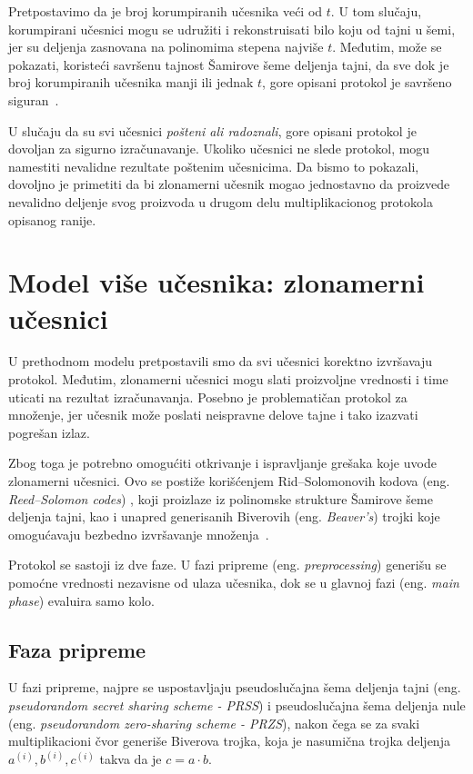 Pretpostavimo da je broj korumpiranih učesnika veći od $t$. U tom slučaju, korumpirani učesnici mogu se udružiti i rekonstruisati bilo koju od tajni u šemi, jer su deljenja zasnovana na polinomima stepena najviše $t$. Međutim, može se pokazati, koristeći savršenu tajnost Šamirove šeme deljenja tajni, da sve dok je broj korumpiranih učesnika manji ili jednak $t$, gore opisani protokol je savršeno siguran~\cite{smart2016cryptography}.

U slučaju da su svi učesnici \emph{pošteni ali radoznali}, gore opisani protokol je dovoljan za sigurno izračunavanje. Ukoliko učesnici ne slede protokol, mogu namestiti nevalidne rezultate poštenim učesnicima. Da bismo to pokazali, dovoljno je primetiti da bi zlonamerni učesnik mogao jednostavno da proizvede nevalidno deljenje svog proizvoda u drugom delu multiplikacionog protokola opisanog ranije\cite{smart2016cryptography}. 


\section{Model više učesnika: zlonamerni učesnici}

U prethodnom modelu pretpostavili smo da svi učesnici korektno izvršavaju protokol. Međutim, zlonamerni učesnici mogu slati proizvoljne vrednosti i time uticati na rezultat izračunavanja. Posebno je problematičan protokol za množenje, jer učesnik može poslati neispravne delove tajne i tako izazvati pogrešan izlaz.

Zbog toga je potrebno omogućiti otkrivanje i ispravljanje grešaka koje uvode zlonamerni učesnici. Ovo se postiže korišćenjem Rid--Solomonovih kodova (eng. \textit{Reed--Solomon codes}) , koji proizlaze iz polinomske strukture Šamirove šeme deljenja tajni, kao i unapred generisanih Biverovih (eng. \textit{Beaver's}) trojki koje omogućavaju bezbedno izvršavanje množenja~\cite{smart2016cryptography}.

Protokol se sastoji iz dve faze. U fazi pripreme (eng. \textit{preprocessing}) generišu se pomoćne vrednosti nezavisne od ulaza učesnika, dok se u glavnoj fazi (eng. \textit{main phase}) evaluira samo kolo.

\subsection{Faza pripreme}

U fazi pripreme, najpre se uspostavljaju pseudoslučajna šema deljenja tajni (eng. \textit{pseudorandom secret sharing scheme - PRSS}) i pseudoslučajna šema deljenja nule (eng. \textit{pseudorandom zero-sharing scheme - PRZS}), nakon čega se za svaki multiplikacioni čvor generiše Biverova trojka, koja je nasumična trojka deljenja \(a^{(i)}, b^{(i)}, c^{(i)}\) takva da je \(c = a\cdot b\).

